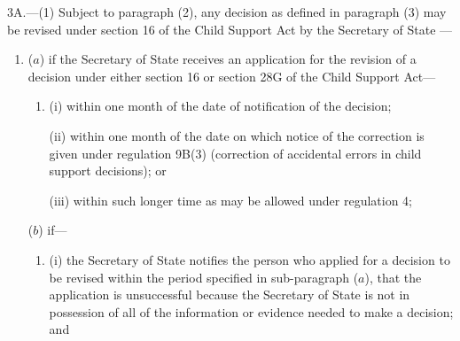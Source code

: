 \documentclass[12pt,a4paper]{article}
\begin{document}
3A.---(1)  Subject to paragraph (2), any decision as defined in paragraph (3) may be revised under section 16 of the Child Support Act by the 
Secretary of State%
—
\begin{enumerate}\item[]
%

($a$) if the Secretary of State receives an application for the revision of a decision under either section 16 or section 28G of the Child Support Act—
\begin{enumerate}\item[]
(i) within one month of the date of notification of the decision;

(ii) within one month of the date on which notice of the correction is given under regulation 9B(3) (correction of accidental errors in child support decisions); or

(iii) within such longer time as may be allowed under regulation 4;
\end{enumerate}

($b$) if—
\begin{enumerate}\item[]
(i) 
the Secretary of State  %
notifies the person who applied for a decision to be revised within the period specified in sub-paragraph ($a$), that the application is unsuccessful because the 
Secretary of State  %
is not in possession of all of the information or evidence needed to make a decision; and


\end{enumerate}
\end{enumerate}
\end{document}
